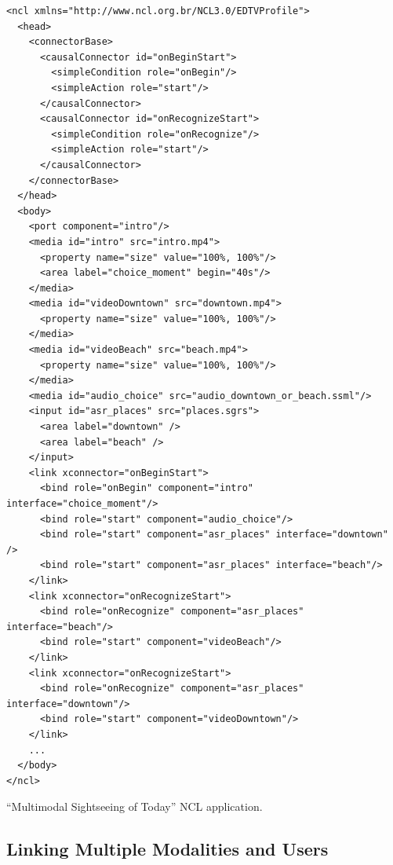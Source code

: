 \documentclass[
  doutorado,
  american
]{ThesisPUC}
\begin{document}
\begin{verbatim}
<ncl xmlns="http://www.ncl.org.br/NCL3.0/EDTVProfile">
  <head>
    <connectorBase>
      <causalConnector id="onBeginStart">
        <simpleCondition role="onBegin"/>
        <simpleAction role="start"/>
      </causalConnector>
      <causalConnector id="onRecognizeStart">
        <simpleCondition role="onRecognize"/>
        <simpleAction role="start"/>
      </causalConnector>
    </connectorBase>
  </head>
  <body>
    <port component="intro"/>
    <media id="intro" src="intro.mp4">
      <property name="size" value="100%, 100%"/>
      <area label="choice_moment" begin="40s"/>
    </media>
    <media id="videoDowntown" src="downtown.mp4">
      <property name="size" value="100%, 100%"/>
    </media>
    <media id="videoBeach" src="beach.mp4">
      <property name="size" value="100%, 100%"/>
    </media>
    <media id="audio_choice" src="audio_downtown_or_beach.ssml"/>
    <input id="asr_places" src="places.sgrs">
      <area label="downtown" />
      <area label="beach" />
    </input>
    <link xconnector="onBeginStart">
      <bind role="onBegin" component="intro" interface="choice_moment"/>
      <bind role="start" component="audio_choice"/>
      <bind role="start" component="asr_places" interface="downtown" />
      <bind role="start" component="asr_places" interface="beach"/>
    </link>
    <link xconnector="onRecognizeStart">
      <bind role="onRecognize" component="asr_places" interface="beach"/>
      <bind role="start" component="videoBeach"/>
    </link>
    <link xconnector="onRecognizeStart">
      <bind role="onRecognize" component="asr_places" interface="downtown"/>
      <bind role="start" component="videoDowntown"/>
    </link>
    ...
  </body>
</ncl>
\end{verbatim}
\begin{listing}[!ht]
\caption{“Multimodal Sightseeing of Today” NCL application.}
\label{list:ncl-sightseeing}
\end{listing}

\subsection{Linking Multiple Modalities and Users}
\label{sec:instantiations:link}
\end{document}
